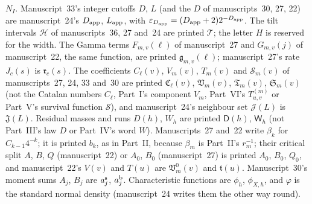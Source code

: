 \documentclass[11pt,a4paper]{article}
\theoremstyle{definition}\newaliascnt{definition}{theorem}
\theoremstyle{remark}\newaliascnt{remark}{theorem}
\newcommand{\eps}{\varepsilon}
\begin{document}
\begin{itemize}
 $N_I$. Manuscript~33's integer cutoffs $D$, $L$ (and the $D$ of
 manuscripts~30, 27, 22) are manuscript~24's $D_{\rm app}$, $L_{\rm app}$,
 with $\eps_{D_{\rm app}}=(D_{\rm app}+2)2^{-D_{\rm app}}$. The tilt intervals
 $\mathcal H$ of manuscripts~36, 27 and~24 are printed $\mathcal T$; the
 letter $H$ is reserved for the width. The Gamma terms $F_{m,v}(\ell)$ of
 manuscript~27 and $G_{m,v}(j)$ of manuscript~22, the same function, are
 printed $\mathfrak g_{m,v}(\ell)$; manuscript~27's rate $J_c(s)$ is
 $\mathfrak r_c(s)$. The coefficients $C_\ell(v)$, $V_m(v)$, $T_m(v)$ and
 $\mathcal S_m(v)$ of manuscripts~27, 24, 33 and~30 are printed
 $\mathfrak C_\ell(v)$, $\mathfrak V_m(v)$, $\mathfrak T_m(v)$,
 $\mathfrak S_m(v)$ (not the Catalan numbers $C_\ell$, Part~I's component
 $V_m$, Part~VI's $T^{(m)}_{u,v}$ or Part~V's survival function
 $\mathcal S$), and manuscript~24's neighbour set $\mathcal J(L)$ is
 $\mathfrak J(L)$. Residual masses and runs $D(h)$, $W_h$ are printed
 $\mathsf D(h)$, $\mathsf W_h$ (not Part~III's law $D$ or Part~IV's word $W$).
 Manuscripts~27 and~22 write $\beta_k$ for $C_{k-1}4^{-k}$; it is printed
 $b_k$, as in Part~II, because $\beta_m$ is Part~II's $r_m^{-1}$; their
 critical split $A$, $B$, $Q$ (manuscript~22) or $A_0$, $B_0$ (manuscript~27)
 is printed $A_0$, $B_0$, $Q_0$, and manuscript~22's $V(v)$ and $T(u)$ are
 $\mathfrak V^0_m(v)$ and $\mathfrak t(u)$. Manuscript~30's moment sums $A_j$,
 $B_j$ are $a^{\rm s}_j$, $a^{\rm b}_j$. Characteristic functions are $\phi_h$,
 $\phi_{X,h}$, and $\varphi$ is the standard normal density (manuscript~24
 writes them the other way round).
\end{itemize}
\end{document}
